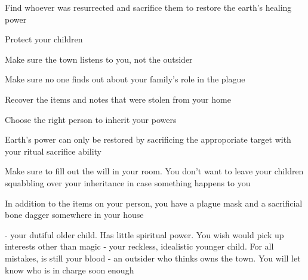 \documentclass[char]{Pestilence}
\begin{document}
\begin{itemz}[Goals]
	\item Find whoever was resurrected and sacrifice them to restore the earth's healing power
	\item Protect your children
	\item Make sure the town listens to you, not the outsider
	\item Make sure no one finds out about your family's role in the plague
	\item Recover the items and notes that were stolen from your home
	\item Choose the right person to inherit your powers
\end{itemz} 

\begin{itemz}[Notes]
	\item Earth's power can only be restored by sacrificing the approporiate target with your ritual sacrifice ability
	\item Make sure to fill out the will in your room. You don't want to leave your children squabbling over your inheritance in case something happens to you
	\item In addition to the items on your person, you have a plague mask and a sacrificial bone dagger somewhere in your house
\end{itemz}

\begin{contacts}
	\contact{\cApprentice{}} - your dutiful older child. Has little spiritual power. You wish \cApprentice{\they} would pick up interests other than magic  
	\contact{\cRebel{}} - your reckless, idealistic younger child. For all \cRebel{\their} mistakes, \cRebel{\they} is still your blood 
	\contact{\cOutsider{}} - an outsider who thinks \cOutsider{\they} owns the town. You will let \cOutsider{\them} know who is in charge soon enough
\end{contacts}
\end{document}
